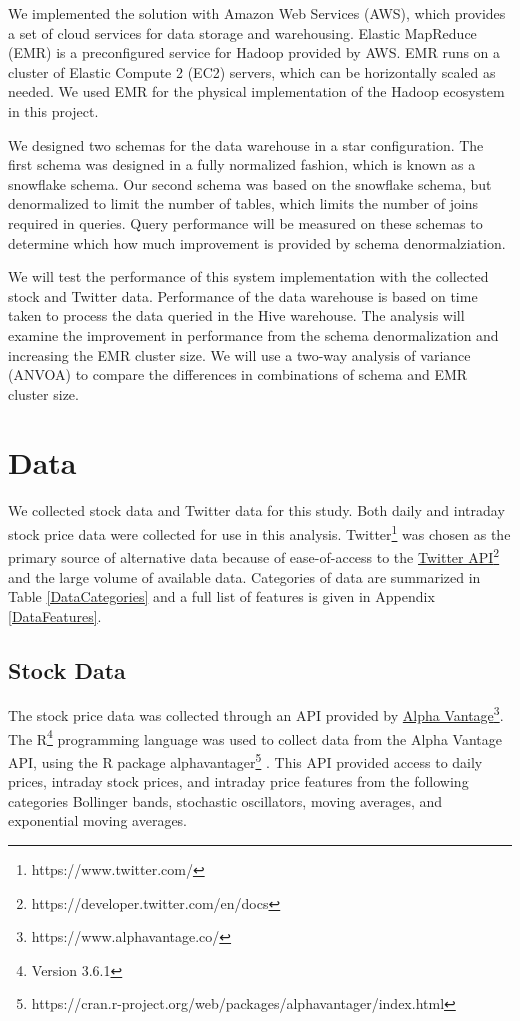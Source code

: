 \documentclass[journal]{IEEEtran}
\begin{document}
We implemented the solution with Amazon Web Services (AWS),
 which provides a set of cloud services for data storage and warehousing.
Elastic MapReduce (EMR) is a preconfigured service for Hadoop provided by AWS.
EMR runs on a cluster of Elastic Compute 2 (EC2) servers,
 which can be horizontally scaled as needed.
We used EMR for the physical implementation of the Hadoop ecosystem in this project.

We designed two schemas for the data warehouse in a star configuration.
The first schema was designed in a fully normalized fashion,
 which is known as a snowflake schema.
Our second schema was based on the snowflake schema, 
 but denormalized to limit the number of tables, 
 which limits the number of joins required in queries.
Query performance will be measured on these schemas to determine
 which how much improvement is provided by schema denormalziation.

We will test the performance of this system implementation with the collected stock and 
 Twitter data. 
Performance of the data warehouse is based on time taken to process the data queried in the Hive 
 warehouse.
The analysis will examine the improvement in performance from the schema denormalization and
 increasing the EMR cluster size.
We will use a two-way analysis of variance (ANVOA) to compare the differences
 in combinations of schema and EMR cluster size.

\section{Data}

We collected stock data and Twitter data for this study.
Both daily and intraday stock price data were collected
 for use in this analysis. 
Twitter\footnote{https://www.twitter.com/}
 was chosen as the primary source of alternative data because of
 ease-of-access to the 
 \href{https://developer.twitter.com/en/docs}{Twitter API}\footnote{https://developer.twitter.com/en/docs}
 and the large volume of available data.
Categories of data are summarized in Table \ref{DataCategories} and a full
 list of features is given in Appendix \ref{DataFeatures}.


\subsection{Stock Data}

The stock price data was collected through an API provided by
 \href{https://www.alphavantage.co/}{Alpha Vantage}\footnote{https://www.alphavantage.co/}.
The R\footnote{Version 3.6.1}
 programming language was used to collect data from the Alpha Vantage API,
 using the R package alphavantager\footnote{https://cran.r-project.org/web/packages/alphavantager/index.html}
\cite{R}.
This API provided access to daily prices, intraday stock prices,
 and intraday price features from the following categories Bollinger bands, 
 stochastic oscillators, moving averages, and exponential moving averages. 
\end{document}
